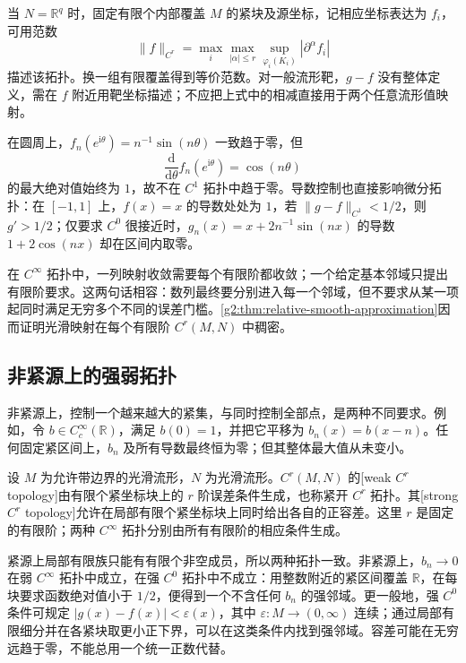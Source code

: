 当 \(N=\mathbb R^q\) 时，固定有限个内部覆盖 \(M\) 的紧块及源坐标，记相应坐标表达为 \(f_i\)，可用范数
\[
	\|f\|_{C^r}=\max_i\max_{|\alpha|\le r}\sup_{\varphi_i(K_i)}|\partial^\alpha f_i|
\]
描述该拓扑。换一组有限覆盖得到等价范数。对一般流形靶，\(g-f\) 没有整体定义，需在 \(f\) 附近用靶坐标描述；不应把上式中的相减直接用于两个任意流形值映射。

\begin{example}
	\label{g2:exm:c0-not-c1-close}
	在圆周上，\(f_n(e^{\mathrm{i}\theta})=n^{-1}\sin(n\theta)\) 一致趋于零，但
	\[
		\frac{\mathrm{d}}{\mathrm{d}\theta}f_n(e^{\mathrm{i}\theta})=\cos(n\theta)
	\]
	的最大绝对值始终为 \(1\)，故不在 \(C^1\) 拓扑中趋于零。导数控制也直接影响微分拓扑：在 \([-1,1]\) 上，\(f(x)=x\) 的导数处处为 \(1\)，若 \(\|g-f\|_{C^1}<1/2\)，则 \(g'>1/2\)；仅要求 \(C^0\) 很接近时，\(g_n(x)=x+2n^{-1}\sin(nx)\) 的导数 \(1+2\cos(nx)\) 却在区间内取零。
\end{example}

在 \(C^\infty\) 拓扑中，一列映射收敛需要每个有限阶都收敛；一个给定基本邻域只提出有限阶要求。这两句话相容：数列最终要分别进入每一个邻域，但不要求从某一项起同时满足无穷多个不同的误差门槛。\cref{g2:thm:relative-smooth-approximation}因而证明光滑映射在每个有限阶 \(C^r(M,N)\) 中稠密。

\subsection{非紧源上的强弱拓扑}
\label{g2:subsec:1401:04}

非紧源上，控制一个越来越大的紧集，与同时控制全部点，是两种不同要求。例如，令 \(b\in C^\infty_c(\mathbb R)\)，满足 \(b(0)=1\)，并把它平移为 \(b_n(x)=b(x-n)\)。任何固定紧区间上，\(b_n\) 及所有导数最终恒为零；但其整体最大值从未变小。

\begin{definition}
	\label{g2:def:weak-strong-cr-topology}
	设 \(M\) 为允许带边界的光滑流形，\(N\) 为光滑流形。\(C^r(M,N)\) 的[weak \(C^r\) topology]由有限个紧坐标块上的 \(r\) 阶误差条件生成，也称紧开 \(C^r\) 拓扑。其[strong \(C^r\) topology]允许在局部有限个紧坐标块上同时给出各自的正容差。这里 \(r\) 是固定的有限阶；两种 \(C^\infty\) 拓扑分别由所有有限阶的相应条件生成。
\end{definition}

紧源上局部有限族只能有有限个非空成员，所以两种拓扑一致。非紧源上，\(b_n\to0\) 在弱 \(C^\infty\) 拓扑中成立，在强 \(C^0\) 拓扑中不成立：用整数附近的紧区间覆盖 \(\mathbb R\)，在每块要求函数绝对值小于 \(1/2\)，便得到一个不含任何 \(b_n\) 的强邻域。更一般地，强 \(C^0\) 条件可规定 \(|g(x)-f(x)|<\varepsilon(x)\)，其中 \(\varepsilon:M\to(0,\infty)\) 连续；通过局部有限细分并在各紧块取更小正下界，可以在这类条件内找到强邻域。容差可能在无穷远趋于零，不能总用一个统一正数代替。

